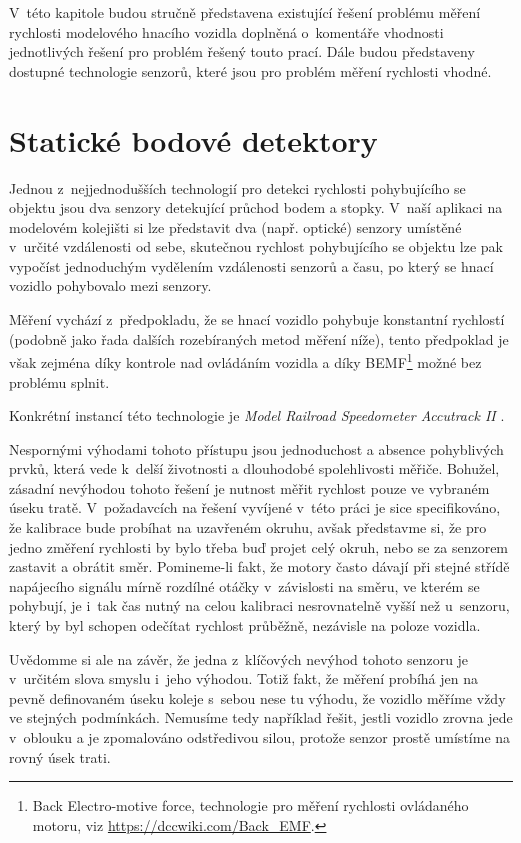 V~této kapitole budou stručně představena existující řešení problému měření
rychlosti modelového hnacího vozidla doplněná o~komentáře vhodnosti
jednotlivých řešení pro problém řešený touto prací. Dále budou představeny
dostupné technologie senzorů, které jsou pro problém měření rychlosti vhodné.

\section{Statické bodové detektory}
\label{sec:det-static}

Jednou z~nejjednodušších technologií pro detekci rychlosti pohybujícího se
objektu jsou dva senzory detekující průchod bodem a stopky. V~naší aplikaci na
modelovém kolejišti si lze představit dva (např. optické) senzory umístěné
v~určité vzdálenosti od sebe, skutečnou rychlost pohybujícího se objektu lze
pak vypočíst jednoduchým vydělením vzdálenosti senzorů a času, po který se
hnací vozidlo pohybovalo mezi senzory.

Měření vychází z~předpokladu, že se hnací vozidlo pohybuje konstantní
rychlostí (podobně jako řada dalších rozebíraných metod měření níže), tento
předpoklad je však zejména díky kontrole nad ovládáním vozidla a díky
BEMF\footnote{Back Electro-motive force, technologie pro měření rychlosti
ovládaného motoru, viz \url{https://dccwiki.com/Back\_EMF}.}
možné bez problému splnit.

Konkrétní instancí této technologie je \textit{Model Railroad
Speedometer Accutrack II} \cite{accutrackII}.

Nespornými výhodami tohoto přístupu jsou jednoduchost a absence pohyblivých
prvků, která vede k~delší životnosti a dlouhodobé spolehlivosti měřiče.
Bohužel, zásadní nevýhodou tohoto řešení je nutnost měřit rychlost pouze ve
vybraném úseku tratě. V~požadavcích na řešení vyvíjené v~této práci je sice
specifikováno, že kalibrace bude probíhat na uzavřeném okruhu, avšak představme
si, že pro jedno změření rychlosti by bylo třeba buď projet celý okruh, nebo se
za senzorem zastavit a obrátit směr. Pomineme-li fakt, že motory často dávají
při stejné střídě napájecího signálu mírně rozdílné otáčky v~závislosti na
směru, ve kterém se pohybují, je i~tak čas nutný na celou kalibraci
nesrovnatelně vyšší než u~senzoru, který by byl schopen odečítat rychlost
průběžně, nezávisle na poloze vozidla.

Uvědomme si ale na závěr, že jedna z~klíčových nevýhod tohoto senzoru je
v~určitém slova smyslu i~jeho výhodou. Totiž fakt, že měření probíhá jen na pevně
definovaném úseku koleje s~sebou nese tu výhodu, že vozidlo měříme vždy ve
stejných podmínkách. Nemusíme tedy například řešit, jestli vozidlo zrovna jede
v~oblouku a je zpomalováno odstředivou silou, protože senzor prostě umístíme
na rovný úsek trati.

